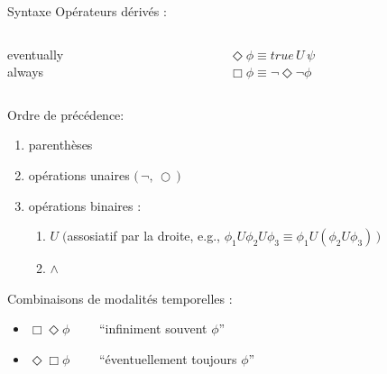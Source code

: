 \documentclass[compress]{beamer}
\begin{document}
\begin{frame}{Syntaxe}{}
\vspace{-0.05\linewidth}
{\color{fibeamer@orange}Opérateurs dérivés : \\ }
\vspace{-0.03\linewidth}
\begin{columns}
  \begin{column}{0.3\linewidth}
    eventually\\
    always \\
  \end{column}
  \begin{column}{0.3\linewidth}
    $ \Diamond \phi \equiv true\, U\, \psi$ \\
    $ \Box \phi \equiv \neg \Diamond \neg \phi $ \\
  \end{column}
\end{columns}
{\vspace{0.02\linewidth}\color{fibeamer@orange}Ordre de précédence: \\ }
\vspace{-0.05\linewidth}
\begin{enumerate}
  \item parenthèses
  \item opérations unaires $\big(\, \neg, \, \bigcirc\, \big)$
  \item opérations binaires :
    \begin{enumerate}
      \item $U \; \big($assosiatif par la droite,
      e.g., $\phi_1 U \phi_2 U \phi_3 \equiv \phi_1 U (\phi_2 U \phi_3) \, \big)$
      \item $\wedge$
    \end{enumerate}
\end{enumerate}
{\color{fibeamer@orange}Combinaisons de modalités temporelles :}
\begin{itemize}
  \item $\Box\Diamond \phi \quad \quad $ ``infiniment souvent $\phi$''
  \item $\Diamond\Box \phi \quad \quad $ ``éventuellement toujours $\phi$''
\end{itemize}
\end{frame}
\end{document}
